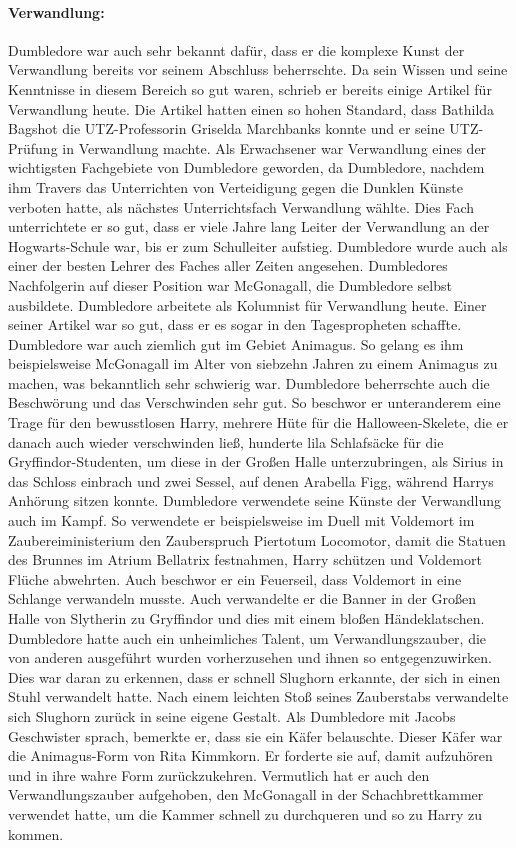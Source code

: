 \documentclass[a4paper, 10pt]{article}
\begin{document}
\paragraph{Verwandlung:}
Dumbledore war auch sehr bekannt dafür, dass er die komplexe Kunst der Verwandlung bereits vor seinem Abschluss beherrschte. Da sein Wissen und seine Kenntnisse in diesem Bereich so gut waren, schrieb er bereits einige Artikel für Verwandlung heute. Die Artikel hatten einen so hohen Standard, dass Bathilda Bagshot die UTZ-Professorin Griselda Marchbanks konnte und er seine UTZ-Prüfung in Verwandlung machte. Als Erwachsener war Verwandlung eines der wichtigsten Fachgebiete von Dumbledore geworden, da Dumbledore, nachdem ihm Travers das Unterrichten von Verteidigung gegen die Dunklen Künste verboten hatte, als nächstes Unterrichtsfach Verwandlung wählte. Dies Fach unterrichtete er so gut, dass er viele Jahre lang Leiter der Verwandlung an der Hogwarts-Schule war, bis er zum Schulleiter aufstieg. Dumbledore wurde auch als einer der besten Lehrer des Faches aller Zeiten angesehen. Dumbledores Nachfolgerin auf dieser Position war McGonagall, die Dumbledore selbst ausbildete. Dumbledore arbeitete als Kolumnist für Verwandlung heute. Einer seiner Artikel war so gut, dass er es sogar in den Tagespropheten schaffte. Dumbledore war auch ziemlich gut im Gebiet Animagus. So gelang es ihm beispielsweise McGonagall im Alter von siebzehn Jahren zu einem Animagus zu machen, was bekanntlich sehr schwierig war. Dumbledore beherrschte auch die Beschwörung und das Verschwinden sehr gut. So beschwor er unteranderem eine Trage für den bewusstlosen Harry, mehrere Hüte für die Halloween-Skelete, die er danach auch wieder verschwinden ließ, hunderte lila Schlafsäcke für die Gryffindor-Studenten, um diese in der Großen Halle unterzubringen, als Sirius in das Schloss einbrach und zwei Sessel, auf denen Arabella Figg, während Harrys Anhörung sitzen konnte. Dumbledore verwendete seine Künste der Verwandlung auch im Kampf. So verwendete er beispielsweise im Duell mit Voldemort im Zaubereiministerium den Zauberspruch Piertotum Locomotor, damit die Statuen des Brunnes im Atrium Bellatrix festnahmen, Harry schützen und Voldemort Flüche abwehrten. Auch beschwor er ein Feuerseil, dass Voldemort in eine Schlange verwandeln musste. Auch verwandelte er die Banner in der Großen Halle von Slytherin zu Gryffindor und dies mit einem bloßen Händeklatschen. Dumbledore hatte auch ein unheimliches Talent, um Verwandlungszauber, die von anderen ausgeführt wurden vorherzusehen und ihnen so entgegenzuwirken. Dies war daran zu erkennen, dass er schnell Slughorn erkannte, der sich in einen Stuhl verwandelt hatte. Nach einem leichten Stoß seines Zauberstabs verwandelte sich Slughorn zurück in seine eigene Gestalt. Als Dumbledore mit Jacobs Geschwister sprach, bemerkte er, dass sie ein Käfer belauschte. Dieser Käfer war die Animagus-Form von Rita Kimmkorn. Er forderte sie auf, damit aufzuhören und in ihre wahre Form zurückzukehren. Vermutlich hat er auch den Verwandlungszauber aufgehoben, den McGonagall in der Schachbrettkammer verwendet hatte, um die Kammer schnell zu durchqueren und so zu Harry zu kommen.
\end{document}
